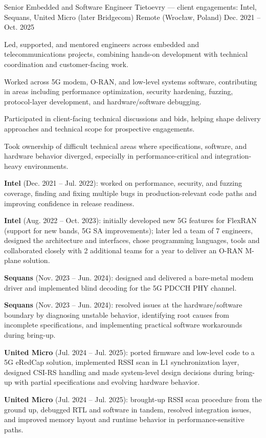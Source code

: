 \begin{cventries}
  \cventry
  {Senior Embedded and Software Engineer}
  {Tietoevry --- client engagements: Intel, Sequans, United Micro (later Bridgecom)}
  {Remote (Wrocław, Poland)}
  {Dec. 2021 -- Oct. 2025}
  {
    \begin{cvitems}
      \item {Led, supported, and mentored engineers across embedded and telecommunications projects, combining hands-on development with technical coordination and customer-facing work.}
      \item {Worked across 5G modem, O-RAN, and low-level systems software, contributing in areas including performance optimization, security hardening, fuzzing, protocol-layer development, and hardware/software debugging.}
      \item {Participated in client-facing technical discussions and bids, helping shape delivery approaches and technical scope for prospective engagements.}
      \item {Took ownership of difficult technical areas where specifications, software, and hardware behavior diverged, especially in performance-critical and integration-heavy environments.}
      \item {\textbf{Intel} ({Dec. 2021 -- Jul. 2022}): worked on performance, security, and fuzzing coverage, finding and fixing multiple bugs in production-relevant code paths and improving confidence in release readiness.}
      \item {\textbf{Intel} ({Aug. 2022 -- Oct. 2023}): initially developed new 5G features for FlexRAN (support for new bands, 5G SA improvements); later led a team of 7 engineers, designed the architecture and interfaces, chose programming languages, tools and collaborated closely with 2 additional teams for a year to deliver an O-RAN M-plane solution.}
      \item {\textbf{Sequans} ({Nov. 2023 -- Jun. 2024}): designed and delivered a bare-metal modem driver and implemented blind decoding for the 5G PDCCH PHY channel.}
      \item {\textbf{Sequans} ({Nov. 2023 -- Jun. 2024}): resolved issues at the hardware/software boundary by diagnosing unstable behavior, identifying root causes from incomplete specifications, and implementing practical software workarounds during bring-up.}
      \item {\textbf{United Micro} ({Jul. 2024 -- Jul. 2025}): ported firmware and low-level code to a 5G eRedCap solution, implemented RSSI scan in L1 synchronization layer, designed CSI-RS handling and made system-level design decisions during bring-up with partial specifications and evolving hardware behavior.}
      \item {\textbf{United Micro} ({Jul. 2024 -- Jul. 2025}): brought-up RSSI scan procedure from the ground up, debugged RTL and software in tandem, resolved integration issues, and improved memory layout and runtime behavior in performance-sensitive paths.}
    \end{cvitems}
  }


\end{cventries}
